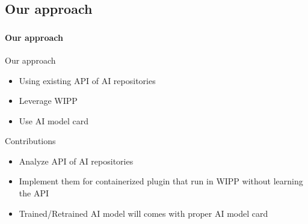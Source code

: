 \def\slidetitle{Our approach}

\subsection{\slidetitle}
\begin{frame}
  \frametitle{\sectiontitle}
  \framesubtitle{\slidetitle}

  \begin{minipage}[h!]{0.90\textwidth}

    Our approach
    \begin{itemize}
      \item Using existing API of AI repositories
      \item Leverage WIPP
      \item Use AI model card
    \end{itemize}

    \bigskip

    Contributions
    \begin{itemize}
      \item Analyze API of AI repositories
      \item Implement them for containerized plugin that run in WIPP without learning the API
      \item Trained/Retrained AI model will comes with proper AI model card
    \end{itemize}

  \end{minipage}
\end{frame}

\def\slidetitle{Plugin concept}

